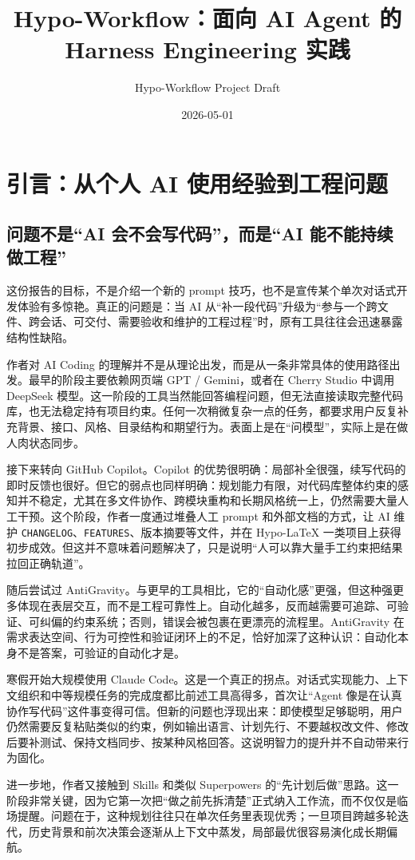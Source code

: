 \documentclass[
  outputdir=build,
  chapterstyle=cn,
  colorscheme=Simple,
  fontset=tech,
  code=false
]{Hypo-Note}
\title{Hypo-Workflow：面向 AI Agent 的 Harness Engineering 实践}
\author{Hypo-Workflow Project Draft}
\date{2026-05-01}
\begin{document}
\makecover
\frontmatter
\tableofcontents
\mainmatter

\chapter{引言：从个人 AI 使用经验到工程问题}

\section{问题不是“AI 会不会写代码”，而是“AI 能不能持续做工程”}

这份报告的目标，不是介绍一个新的 prompt 技巧，也不是宣传某个单次对话式开发体验有多惊艳。真正的问题是：当 AI 从“补一段代码”升级为“参与一个跨文件、跨会话、可交付、需要验收和维护的工程过程”时，原有工具往往会迅速暴露结构性缺陷。

作者对 AI Coding 的理解并不是从理论出发，而是从一条非常具体的使用路径出发。最早的阶段主要依赖网页端 GPT / Gemini，或者在 Cherry Studio 中调用 DeepSeek 模型。这一阶段的工具当然能回答编程问题，但无法直接读取完整代码库，也无法稳定持有项目约束。任何一次稍微复杂一点的任务，都要求用户反复补充背景、接口、风格、目录结构和期望行为。表面上是在“问模型”，实际上是在做人肉状态同步。

接下来转向 GitHub Copilot。Copilot 的优势很明确：局部补全很强，续写代码的即时反馈也很好。但它的弱点也同样明确：规划能力有限，对代码库整体约束的感知并不稳定，尤其在多文件协作、跨模块重构和长期风格统一上，仍然需要大量人工干预。这个阶段，作者一度通过堆叠人工 prompt 和外部文档的方式，让 AI 维护 \texttt{CHANGELOG}、\texttt{FEATURES}、版本摘要等文件，并在 Hypo-LaTeX 一类项目上获得初步成效。但这并不意味着问题解决了，只是说明“人可以靠大量手工约束把结果拉回正确轨道”。

随后尝试过 AntiGravity。与更早的工具相比，它的“自动化感”更强，但这种强更多体现在表层交互，而不是工程可靠性上。自动化越多，反而越需要可追踪、可验证、可纠偏的约束系统；否则，错误会被包裹在更漂亮的流程里。AntiGravity 在需求表达空间、行为可控性和验证闭环上的不足，恰好加深了这种认识：自动化本身不是答案，可验证的自动化才是。

寒假开始大规模使用 Claude Code。这是一个真正的拐点。对话式实现能力、上下文组织和中等规模任务的完成度都比前述工具高得多，首次让“Agent 像是在认真协作写代码”这件事变得可信。但新的问题也浮现出来：即使模型足够聪明，用户仍然需要反复粘贴类似的约束，例如输出语言、计划先行、不要越权改文件、修改后要补测试、保持文档同步、按某种风格回答。这说明智力的提升并不自动带来行为固化。

进一步地，作者又接触到 Skills 和类似 Superpowers 的“先计划后做”思路。这一阶段非常关键，因为它第一次把“做之前先拆清楚”正式纳入工作流，而不仅仅是临场提醒。问题在于，这种规划往往只在单次任务里表现优秀；一旦项目跨越多轮迭代，历史背景和前次决策会逐渐从上下文中蒸发，局部最优很容易演化成长期偏航。
\end{document}

